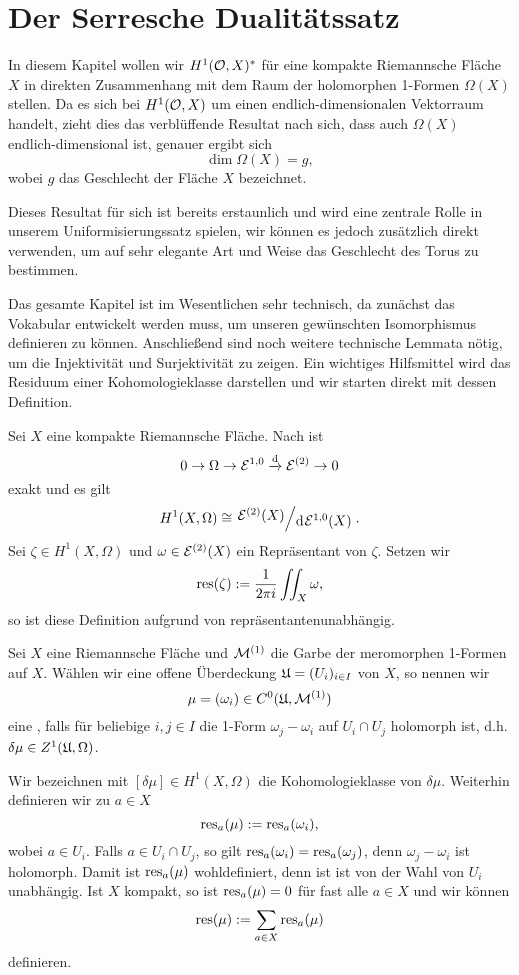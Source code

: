 
\section{Der Serresche Dualitätssatz}
\label{sec:serre}

In diesem Kapitel wollen wir $H^1(\mathcal{O}, X)^\ast$ für eine kompakte
Riemannsche Fläche $X$ in direkten Zusammenhang mit dem Raum der
holomorphen 1-Formen $\Omega(X)$ stellen. Da es sich bei $H^1(\mathcal{O},
X)$ um einen endlich-dimensionalen Vektorraum handelt, zieht dies das
verblüffende Resultat nach sich, dass auch $\Omega(X)$
endlich-dimensional ist, genauer ergibt sich
\[
\dim \Omega(X) = g,
\]
wobei $g$ das Geschlecht der Fläche $X$ bezeichnet.

Dieses Resultat für sich ist bereits erstaunlich und wird eine
zentrale Rolle in unserem Uniformisierungssatz spielen, wir können es
jedoch zusätzlich direkt verwenden, um auf sehr elegante Art und Weise das
Geschlecht des Torus zu bestimmen.

Das gesamte Kapitel ist im Wesentlichen sehr technisch, da zunächst
das Vokabular entwickelt werden muss, um unseren gewünschten
Isomorphismus definieren zu können. Anschließend sind noch weitere
technische Lemmata nötig, um die Injektivität und Surjektivität zu
zeigen. Ein wichtiges Hilfsmittel wird das Residuum einer
Kohomologieklasse darstellen und wir starten direkt mit dessen Definition.

\begin{defin}
  \label{def:res}
  Sei $X$ eine kompakte Riemannsche Fläche. Nach \cite[Satz 15.14]{For} ist
  \[
  0 \ra \Omega \ra \diff^{1,0} \xrightarrow{\d} \diff^{(2)} \ra 0
  \]
  exakt und es gilt
  \[
  H^1(X, \Omega) \cong \quot{\diff^{(2)}(X)}{\d[\diff^{1,0}(X)]}.
  \]
  Sei $\zeta \in H^1(X,
  \Omega)$ und $\omega \in \mathcal{E}^{(2)}(X)$ ein Repräsentant von
  $\zeta$. Setzen wir
  \[
  \operatorname{res}(\zeta) := \frac{1}{2\pi i} \iint_X \omega,
  \]
  so ist diese Definition aufgrund von \cite[Satz 10.20]{For} repräsentantenunabhängig.
\end{defin}

\begin{defin}
  \label{def:mlv}
  Sei $X$ eine Riemannsche Fläche und $\mathcal{M}^{(1)}$ die Garbe der
  meromorphen 1-Formen auf $X$. Wählen wir eine offene Überdeckung
  $\mathfrak{U} = (U_i)_{i \in I}$ von $X$, so nennen wir
  \[
  \mu = (\omega_i) \in C^0( \mathfrak{U}, \mathcal{M}^{(1)})
  \]
  eine , falls für beliebige $i,j \in
  I$ die 1-Form $\omega_j - \omega_i$ auf $U_i \cap U_j$ holomorph
  ist, d.h. $ \delta \mu \in Z^1(\mathfrak{U}, \Omega)$.

  Wir bezeichnen mit $[\delta \mu] \in H^1(X, \Omega)$ die
  Kohomologieklasse von $\delta \mu$. Weiterhin definieren wir zu $a \in X$
  \[
  \operatorname{res}_a(\mu) := \operatorname{res}_a(\omega_i),
  \]
  wobei $a \in U_i$. Falls $a \in U_i \cap U_j$, so gilt
  $\operatorname{res}_a(\omega_i) = \operatorname{res}_a(\omega_j)$, denn $\omega_j - \omega_i$
  ist holomorph. Damit ist $\operatorname{res}_a(\mu)$ wohldefiniert, denn ist ist
  von der Wahl von $U_i$ unabhängig. Ist $X$ kompakt, so ist $\operatorname{res}_a(\mu) = 0$ für fast
  alle $a \in X$ und wir können
  \[
  \operatorname{res}(\mu) := \sum_{a \in X} \operatorname{res}_a(\mu)
  \]
  definieren.
\end{defin}

